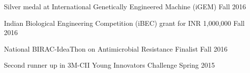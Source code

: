 Silver medal at International Genetically Engineered Machine (iGEM) \hfill Fall 2016

Indian Biological Engineering Competition (iBEC) grant for INR 1,000,000 \hfill Fall 2016

National BIRAC-IdeaThon on Antimicrobial Resistance Finalist \hfill Fall 2016

Second runner up in 3M-CII Young Innovators Challenge \hfill Spring 2015

\phantom{Phantom text to fix alignment issue in previous line}
